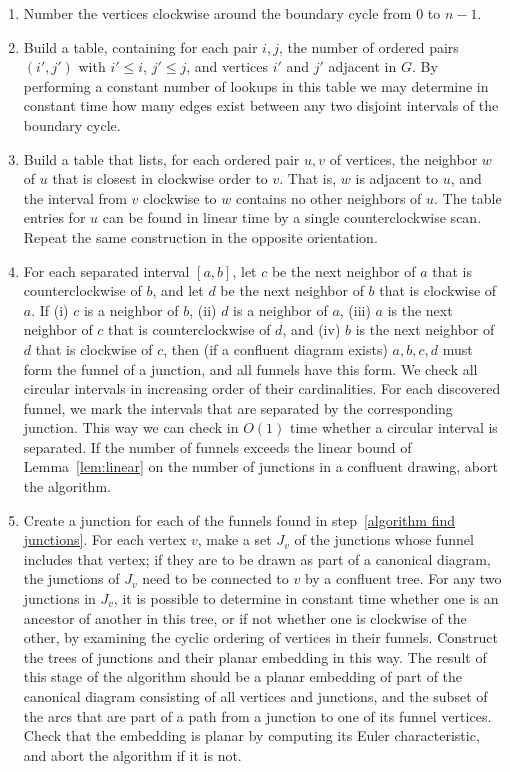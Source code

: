 \documentclass{llncs}
\begin{document}
\begin{enumerate}
\item Number the vertices clockwise around the boundary cycle from $0$ to $n-1$.
\item\label{algorithm interval adjacency} Build a table, containing for each pair $i,j$, the number of ordered pairs $(i',j')$ with $i'\le i$, $j'\le j$, and vertices $i'$ and $j'$ adjacent in $G$. By performing a constant number of lookups in this table we may determine in constant time how many edges exist between any two disjoint intervals of the boundary cycle.
\item Build a table that lists, for each ordered pair $u,v$ of vertices, the neighbor $w$ of $u$ that is closest in clockwise order to $v$. That is, $w$ is adjacent to $u$, and the interval from $v$ clockwise to $w$ contains no other neighbors of $u$. The table entries for $u$ can be found in linear time by a single counterclockwise scan. Repeat the same construction in the opposite orientation.
\item\label{algorithm find junctions} For each separated interval $[a, b]$, let $c$ be the next neighbor of $a$ that is counterclockwise of $b$, and let $d$ be the next neighbor of $b$ that is clockwise of $a$. If (i) $c$ is a neighbor of $b$, (ii) $d$ is a neighbor of $a$, (iii) $a$ is the next neighbor of $c$ that is counterclockwise of $d$, and (iv) $b$ is the next neighbor of $d$ that is clockwise of $c$, then
(if a confluent diagram exists) $a,b,c,d$ must form the funnel of a junction, and all funnels have this form. We check all circular intervals in increasing order of their cardinalities. For each discovered funnel, we mark the intervals that are separated by the corresponding junction. This way we can check in $O(1)$ time whether a circular interval is separated.
If the number of funnels exceeds the linear bound of Lemma~\ref{lem:linear} on the number of junctions in a confluent drawing, abort the algorithm.
\item\label{algorithm funnel junctions} Create a junction for each of the funnels found in step~\ref{algorithm find junctions}. For each vertex $v$, make a set $J_v$ of the junctions whose funnel includes that vertex; if they are to be drawn as part of a canonical diagram, the junctions of $J_v$ need to be connected to $v$ by a confluent tree. For any two junctions in $J_v$, it is possible to determine in constant time whether one is an ancestor of another in this tree, or if not whether one is clockwise of the other, by examining the cyclic ordering of vertices in their funnels. Construct the trees of junctions and their planar embedding in this way. The result of this stage of the algorithm should be a planar embedding of part of the canonical diagram consisting of all vertices and junctions, and the subset of the arcs that are part of a path from a junction to one of its funnel vertices. Check that the embedding is planar by computing its Euler characteristic, and abort the algorithm if it is not.

\end{enumerate}
\end{document}
